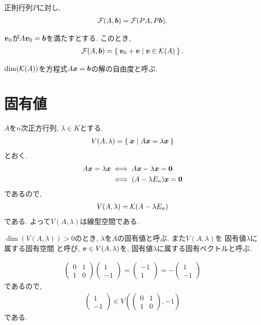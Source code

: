 \begin{prop}
  正則行列$P$に対し,
\begin{align*}
  \mathcal{F}(A,\boldsymbol{b})=\mathcal{F}(PA,P\boldsymbol{b}).
\end{align*}
\end{prop}

\begin{prop}
  $\boldsymbol{v}_0$が$A\boldsymbol{v}_0=\boldsymbol{b}$を満たすとする.
  このとき,
  \begin{align*}
    \mathcal{F}(A,\boldsymbol{b})=\Set{\boldsymbol{v}_0+\boldsymbol{v}|\boldsymbol{v}\in \mathcal{K}(A)}.
  \end{align*}
\end{prop}
\begin{definition}
$\dim(\mathcal{K}(A))$を方程式$A\boldsymbol{x}=\boldsymbol{b}$の解の自由度と呼ぶ.
\end{definition}

\section{固有値}
$A$を$n$次正方行列,
$\lambda\in K$とする.
\begin{align*}
  V(A,\lambda)=\Set{\boldsymbol{x}|A\boldsymbol{x}=\lambda\boldsymbol{x}}
\end{align*}
とおく.
\begin{align*}
  A\boldsymbol{x}=\lambda\boldsymbol{x}
  &\iff A\boldsymbol{x}-\lambda\boldsymbol{x}=\boldsymbol{0}\\
  &\iff (A-\lambda E_n)\boldsymbol{x}=\boldsymbol{0}\\
\end{align*}
であるので,
\begin{align*}
  V(A,\lambda)=\mathcal{K}(A-\lambda E_n)
\end{align*}
である.
よって$V(A,\lambda)$は線型空間である.
\begin{definition}
$\dim(V(A,\lambda))>0$のとき,
$\lambda$を$A$の固有値と呼ぶ.
  また$V(A,\lambda)$を
  固有値$\lambda$に属する固有空間
  と呼び,
  $\boldsymbol{v}\in V(A,\lambda)$を,
  固有値$\lambda$に属する固有ベクトルと呼ぶ.
\end{definition}
\begin{example}
  \begin{align*}
    \begin{pmatrix}0&1\\1&0\end{pmatrix}
      \begin{pmatrix}1\\-1\end{pmatrix}
        =
      \begin{pmatrix}-1\\1\end{pmatrix}
        =
      -\begin{pmatrix}1\\-1\end{pmatrix}
  \end{align*}
  であるので,
  \begin{align*}
    \begin{pmatrix}1\\-1\end{pmatrix}
      \in
      V(\begin{pmatrix}0&1\\1&0\end{pmatrix},-1)
  \end{align*}
  である.
\end{example}
